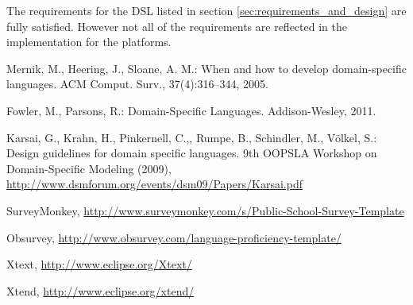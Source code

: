 \documentclass[runningheads]{llncs}
\begin{document}
The requirements for the DSL listed in section \ref{sec:requirements_and_design} are fully satisfied. However not all of the requirements are reflected in the implementation for the platforms. 

\begin{thebibliography}{4}

 Mernik, M., Heering, J., Sloane, A. M.: When and how to develop domain-specific languages. ACM Comput. Surv., 37(4):316–344, 2005.

  Fowler, M., Parsons, R.: Domain-Specific Languages. Addison-Wesley, 2011.

 Karsai, G., Krahn, H., Pinkernell, C.,, Rumpe, B., Schindler, M., Völkel, S.: Design guidelines for domain specific languages. 
9th OOPSLA Workshop on Domain-Specific Modeling (2009), \url{http://www.dsmforum.org/events/dsm09/Papers/Karsai.pdf}

SurveyMonkey, \url{http://www.surveymonkey.com/s/Public-School-Survey-Template}

Obsurvey, \url{http://www.obsurvey.com/language-proficiency-template/}

Xtext, \url{http://www.eclipse.org/Xtext/}

Xtend, \url{http://www.eclipse.org/xtend/}

\end{thebibliography}
\end{document}
